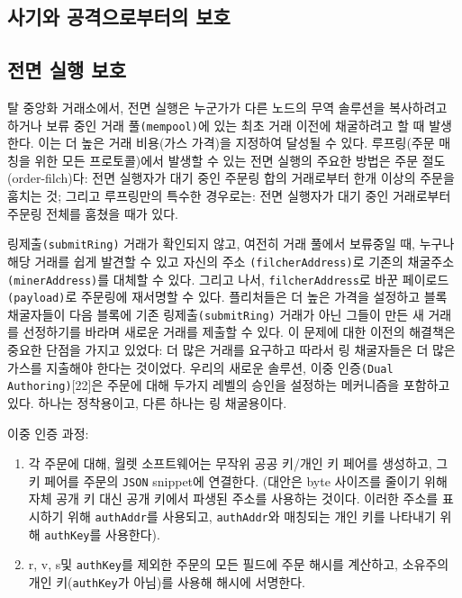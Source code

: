 \documentclass{article}
\begin{document}
\begin{multicols}{2}
\section{사기와 공격으로부터의 보호}

\subsection{전면 실행 보호\label{sec:dual_authoring}}
탈 중앙화 거래소에서, 전면 실행은 누군가가 다른 노드의 무역 솔루션을 복사하려고 하거나 보류 중인 거래 풀\verb|(mempool)|에 있는 최초 거래 이전에 채굴하려고 할 때 발생한다. 이는 더 높은 거래 비용(가스 가격)을 지정하여 달성될 수 있다. 루프링(주문 매칭을 위한 모든 프로토콜)에서 발생할 수 있는 전면 실행의 주요한 방법은 주문 절도(order-filch)다: 전면 실행자가 대기 중인 주문링 합의 거래로부터 한개 이상의 주문을 훔치는 것; 그리고 루프링만의 특수한 경우로는: 전면 실행자가 대기 중인 거래로부터 주문링 전체를 훔쳤을 때가 있다.

링제출\verb|(submitRing)| 거래가 확인되지 않고, 여전히 거래 풀에서 보류중일 때, 누구나 해당 거래를 쉽게 발견할 수 있고 자신의 주소 \verb|(filcherAddress)|로 기존의 채굴주소\verb|(minerAddress)|를 대체할 수 있다. 그리고 나서, \verb|filcherAddress|로 바꾼 페이로드\verb|(payload)|로 주문링에 재서명할 수 있다. 플리처들은 더 높은 가격을 설정하고 블록 채굴자들이 다음 블록에 기존 링제출\verb|(submitRing)| 거래가 아닌 그들이 만든 새 거래를 선정하기를 바라며 새로운 거래를 제출할 수 있다.
이 문제에 대한 이전의 해결책은 중요한 단점을 가지고 있었다: 더 많은 거래를 요구하고 따라서 링 채굴자들은 더 많은 가스를 지출해야 한다는 것이었다. 우리의 새로운 솔루션, 이중 인증\verb|(Dual Authoring)|[22]은 주문에 대해 두가지 레벨의 승인을 설정하는 메커니즘을 포함하고 있다. 하나는 정착용이고, 다른 하나는 링 채굴용이다.

이중 인증 과정:

\begin{enumerate}

      \item 각 주문에 대해, 월렛 소프트웨어는 무작위 공공 키/개인 키 페어를 생성하고, 그 키 페어를 주문의 \verb|JSON| snippet에 연결한다. (대안은 byte 사이즈를 줄이기 위해 자체 공개 키 대신 공개 키에서 파생된 주소를 사용하는 것이다. 이러한 주소를 표시하기 위해 \verb|authAddr|를 사용되고, \verb|authAddr|와 매칭되는 개인 키를 나타내기 위해 \verb|authKey|를 사용한다).
     
      \item r, v, s및 \verb|authKey|를 제외한 주문의 모든 필드에 주문 해시를 계산하고, 소유주의 개인 키(\verb|authKey|가 아님)를 사용해 해시에 서명한다. 
      

\end{enumerate}
\end{multicols}
\end{document}

